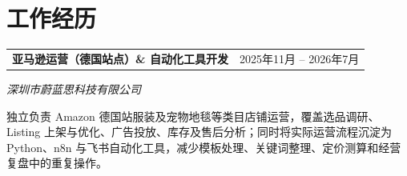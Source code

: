 \documentclass[10pt, a4paper]{article}
\begin{document}
\vspace{1pt}

\section{工作经历}

\noindent
\begin{tabularx}{\textwidth}{@{}X r@{}}
{\fontsize{10}{12}\selectfont\textbf{亚马逊运营（德国站点）\& 自动化工具开发}} &
{\fontsize{10}{12}\selectfont 2025年11月 -- 2026年7月}
\end{tabularx}

 \hfill {\fontsize{10}{12}\selectfont\textit{深圳市蔚蓝思科技有限公司}}

\vspace{1pt}
{\fontsize{9}{12}\selectfont
独立负责 Amazon 德国站服装及宠物地毯等类目店铺运营，覆盖选品调研、Listing 上架与优化、广告投放、库存及售后分析；同时将实际运营流程沉淀为 Python、n8n 与飞书自动化工具，减少模板处理、关键词整理、定价测算和经营复盘中的重复操作。
}
\end{document}
